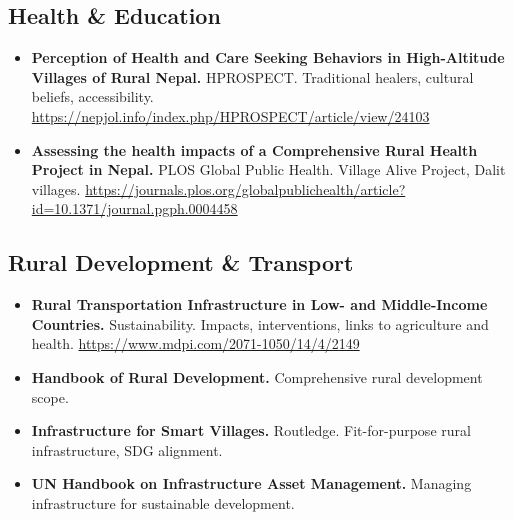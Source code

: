 \documentclass[11pt,a4paper]{article}
\begin{document}
\subsection{Health \& Education}
\begin{itemize}
    \item \textbf{Perception of Health and Care Seeking Behaviors in High-Altitude Villages of Rural Nepal.} HPROSPECT. Traditional healers, cultural beliefs, accessibility. \url{https://nepjol.info/index.php/HPROSPECT/article/view/24103}
    \item \textbf{Assessing the health impacts of a Comprehensive Rural Health Project in Nepal.} PLOS Global Public Health. Village Alive Project, Dalit villages. \url{https://journals.plos.org/globalpublichealth/article?id=10.1371/journal.pgph.0004458}
\end{itemize}

\subsection{Rural Development \& Transport}
\begin{itemize}
    \item \textbf{Rural Transportation Infrastructure in Low- and Middle-Income Countries.} Sustainability. 
    Impacts, interventions, links to agriculture and health. \url{https://www.mdpi.com/2071-1050/14/4/2149}
    \item \textbf{Handbook of Rural Development.} Comprehensive rural development scope.
    \item \textbf{Infrastructure for Smart Villages.} Routledge. Fit-for-purpose rural infrastructure, SDG alignment.
    \item \textbf{UN Handbook on Infrastructure Asset Management.} Managing infrastructure for sustainable development.
\end{itemize}
\end{document}

